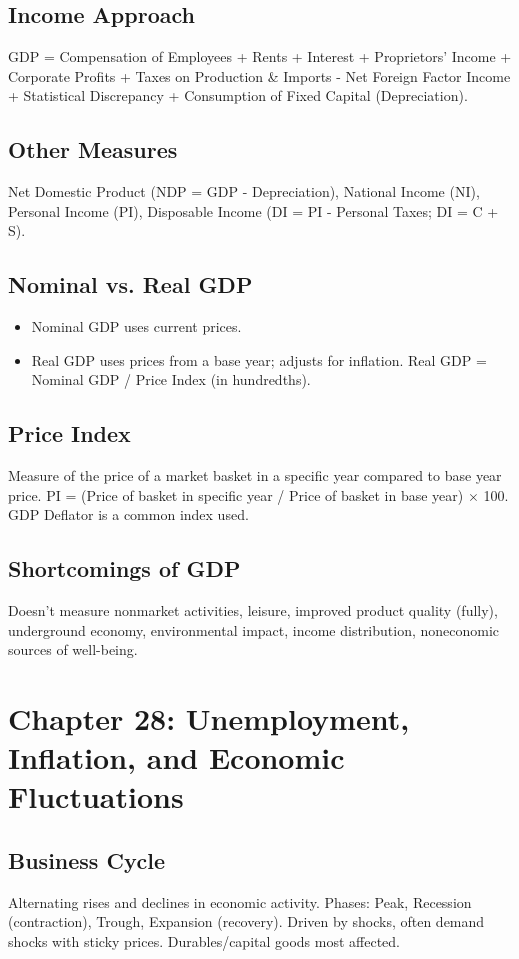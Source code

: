 \documentclass{article}
\begin{document}
\subsection*{Income Approach}
GDP = Compensation of Employees + Rents + Interest + Proprietors' Income + Corporate Profits + Taxes on Production \& Imports - Net Foreign Factor Income + Statistical Discrepancy + Consumption of Fixed Capital (Depreciation).

\subsection*{Other Measures}
Net Domestic Product (NDP = GDP - Depreciation), National Income (NI), Personal Income (PI), Disposable Income (DI = PI - Personal Taxes; DI = C + S).

\subsection*{Nominal vs. Real GDP}
\begin{itemize}
    \item Nominal GDP uses current prices.
    \item Real GDP uses prices from a base year; adjusts for inflation. Real GDP = Nominal GDP / Price Index (in hundredths).
\end{itemize}

\subsection*{Price Index}
Measure of the price of a market basket in a specific year compared to base year price. PI = (Price of basket in specific year / Price of basket in base year) $\times$ 100. GDP Deflator is a common index used.

\subsection*{Shortcomings of GDP}
Doesn't measure nonmarket activities, leisure, improved product quality (fully), underground economy, environmental impact, income distribution, noneconomic sources of well-being.

\section*{Chapter 28: Unemployment, Inflation, and Economic Fluctuations}

\subsection*{Business Cycle}
Alternating rises and declines in economic activity. Phases: Peak, Recession (contraction), Trough, Expansion (recovery). Driven by shocks, often demand shocks with sticky prices. Durables/capital goods most affected.
\end{document}
